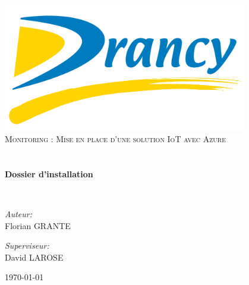\begin{titlepage}
\begin{center}

\includegraphics[width=0.8\textwidth]{./images/logo}~\\[1cm]

\textsc{\LARGE Monitoring : Mise en place d'une solution IoT avec Azure}\\[1.5cm]

\textsc{\Large }\\[0.5cm]

\HRule \\[0.4cm]

{\huge \bfseries Dossier d'installation\\[0.4cm] }

\HRule \\[1.5cm]

\begin{minipage}{0.4\textwidth}
\begin{flushleft} \large
\emph{Auteur:}\\
Florian \textsc{GRANTE}\\
\end{flushleft}
\end{minipage}
\begin{minipage}{0.4\textwidth}
\begin{flushright} \large
\emph{Superviseur:} \\
David \textsc{LAROSE}
\end{flushright}
\end{minipage}

\vfill

{\large \today}

\end{center}
\end{titlepage}